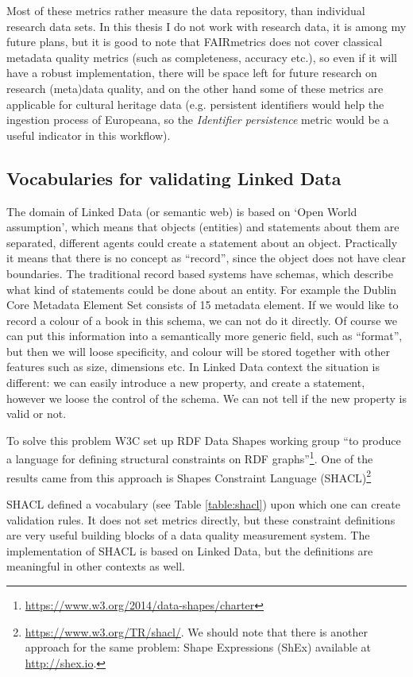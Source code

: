 Most of these metrics rather measure the data repository, than individual research data sets. In this thesis I do not work with research data, it is among my future plans, but it is good to note that FAIRmetrics does not cover classical metadata quality metrics (such as completeness, accuracy etc.), so even if it will have a robust implementation, there will be space left for future research on research (meta)data quality, and on the other hand some of these metrics are applicable for cultural heritage data (e.g. persistent identifiers would help the ingestion process of Europeana, so the \emph{Identifier persistence} metric would be a useful indicator in this workflow).

\subsection{Vocabularies for validating Linked Data}

The domain of Linked Data (or semantic web) is based on `Open World assumption', which means that objects (entities) and statements about them are separated, different agents could create a statement about an object. Practically it means that there is no concept as ``record'', since the object does not have clear boundaries. The traditional record based systems have schemas, which describe what kind of statements could be done about an entity. For example the Dublin Core Metadata Element Set consists of 15 metadata element. If we would like to record a colour of a book in this schema, we can not do it directly. Of course we can put this information into a semantically more generic field, such as ``format'', but then we will loose specificity, and colour will be stored together with other features such as size, dimensions etc. In Linked Data context the situation is different: we can easily introduce a new property, and create a statement, however we loose the control of the schema. We can not tell if the new property is valid or not.

To solve this problem W3C set up RDF Data Shapes working group ``to produce a language for defining structural constraints on RDF graphs''\footnote{\url{https://www.w3.org/2014/data-shapes/charter}}. One of the results came from this approach is Shapes Constraint Language (SHACL)\footnote{\url{https://www.w3.org/TR/shacl/}. We should note that there is another approach for the same problem: Shape Expressions (ShEx) available at \url{http://shex.io}.}

SHACL defined a vocabulary (see Table \ref{table:shacl}) upon which one can create validation rules. It does not set metrics directly, but these constraint definitions are very useful building blocks of a data quality measurement system. The implementation of SHACL is based on Linked Data, but the definitions are meaningful in other contexts as well.

